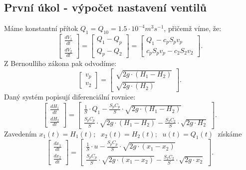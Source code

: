 \documentclass[a4paper,11pt]{article}
\begin{document}
\subsection{První úkol - výpočet nastavení ventilů}
Máme konstantní přítok $Q_{1}=Q_{10}=1.5\cdot 10^{-4}m^{3}s^{-1}$, přičemž víme, že:
\begin{equation}
\left [\begin{array}{cc}
\frac{dV_{1}}{dt}\\
\frac{dV_{2}}{dt}
\end{array}\right ] = 
\left [\begin{array}{cc}
Q_{1}-Q_{p}\\
Q_{p}-Q_{2}\end{array}\right ] = 
\left [\begin{array}{cc}
Q_{1}-c_{p}S_{p}v_{p}\\
c_{p}S_{p}v_{p}-c_{2}S_{2}v_{2}\end{array}\right ].
\end{equation}
Z Bernoulliho zákona pak odvodíme:
\begin{equation}
\left [\begin{array}{cc}
v_{p} \\
v_{2}
\end{array}\right ] = 
\left [\begin{array}{cc}
\sqrt{2g\cdot (H_{1}-H_{2})}\\
\sqrt{2g\cdot (H_{2})}\end{array}\right ].
\end{equation}
Daný systém popisují diferenciální rovnice:
\begin{equation}
\left [\begin{array}{cc}
\frac{dH_{1}}{dt} \\
\frac{dH_{2}}{dt}
\end{array}\right ] = 
\left [\begin{array}{cc}
\frac{1}{S}\cdot Q_{1}-\frac{S_{p}C_{p}}{S}\cdot \sqrt{2g\cdot (H_{1}-H_{2})}\\
\frac{S_{p}C_{p}}{S}\cdot \sqrt{2g\cdot \left ( H_{1}-H_{2} \right )}-\frac{S_{2}C_{2}}{S}\cdot \sqrt{2g\cdot H_{2}}\end{array}\right ].
\end{equation}
Zavedením 
$ x_{1}(t)=H_{1}(t);\;$ 
$x_{2}(t)=H_{2}(t);\;$ 
$u(t)=Q_{1}(t)\; $
získáme
\begin{equation}\label{eq:Stavove_x} 
\left [\begin{array}{cc}
\frac{dx_{1}}{dt} \\
\frac{dx_{2}}{dt}
\end{array}\right ] = 
\left [\begin{array}{cc}
\frac{1}{S}\cdot u-\frac{S_{p}C_{p}}{S}\cdot \sqrt{2g\cdot (x_{1}- x_{2})}\\
\frac{S_{p}C_{p}}{S}\cdot \sqrt{2g\cdot \left ( x_{1}-x_{2} \right )}-\frac{S_{2}C_{2}}{S}\cdot \sqrt{2g\cdot x_{2}}\end{array}\right ].
\end{equation}
\end{document}
